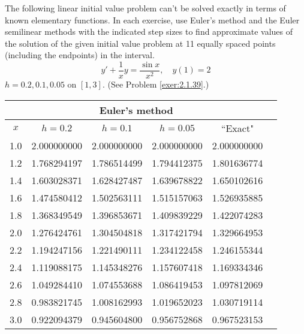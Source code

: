\documentclass{ximera}
\begin{document}
\begin{problem}\label{exer:3.1.16} The following linear initial value problem can't be solved exactly in terms of known elementary functions. In each exercise, use
Euler's method and the Euler semilinear methods
with the indicated step sizes to find approximate values of the
solution of the given initial value problem at 11 equally spaced
points (including the endpoints) in the interval.
$$y'+\frac{1}{x}y=\frac{\sin x}{x^2},\quad y(1)=2$$
$h=0.2,0.1,0.05$ on $[1,3]$. (See Problem \ref{exer:2.1.39}.)



\begin{solution}
    {\small
\begin{tabular}{|c|r|r|r|r|r|}
\hline
\multicolumn{5}{|c|}{Euler's method}\\\hline
\multicolumn{1}{|c|}{$x$}&
\multicolumn{1}{|c|}{$h=0.2$}&
\multicolumn{1}{|c|}{$h=0.1$}&
\multicolumn{1}{|c|}{$h=0.05$}&
\multicolumn{1}{|c|}{``Exact"}\\ \hline
1.0 & 2.000000000 & 2.000000000 & 2.000000000 & 2.000000000 \\
1.2 & 1.768294197 & 1.786514499 & 1.794412375 & 1.801636774 \\
1.4 & 1.603028371 & 1.628427487 & 1.639678822 & 1.650102616 \\
1.6 & 1.474580412 & 1.502563111 & 1.515157063 & 1.526935885 \\
1.8 & 1.368349549 & 1.396853671 & 1.409839229 & 1.422074283 \\
2.0 & 1.276424761 & 1.304504818 & 1.317421794 & 1.329664953 \\
2.2 & 1.194247156 & 1.221490111 & 1.234122458 & 1.246155344 \\
2.4 & 1.119088175 & 1.145348276 & 1.157607418 & 1.169334346 \\
2.6 & 1.049284410 & 1.074553688 & 1.086419453 & 1.097812069 \\
2.8 & 0.983821745 & 1.008162993 & 1.019652023 & 1.030719114 \\
3.0 & 0.922094379 & 0.945604800 & 0.956752868 & 0.967523153 \\
\hline
\end{tabular}}


\end{solution}
\end{problem}
\end{document}
